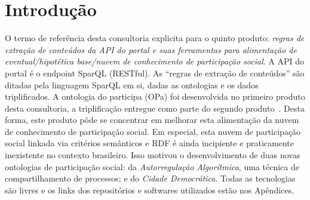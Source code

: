 \documentclass[12pt]{article}
\newcommand{\PalavrasChave}{reconhecimento de padrões, redes complexas, processamento de linguagem natural, web semântica, participação social}
\begin{document}



\tableofcontents
\newpage


\begin{abstract}
Este documento descreve a alimentação com dados do Participa.br da nuvem de conhecimento de participação social. Não havia dados participativos brasileiros linkados, então a nuvem foi iniciada com a especificação ontológica e triplificação dos dados de duas outras instâncias: do AA, um sistema de compartilhamento de processos usado por programadores e midialivristas; e do Cidade Democrática, um portal participativo capitaneado pela sociedade civil. A triplificação do participa.br e sua ontológia (OPa) foram feitas no primeiro e segundo produtos desta consultoria. Este trabalho aponta melhoras nesta integração do Participa.br aos dados linkados.
{\bf Palavras-chave:} \PalavrasChave.
\end{abstract}
\newpage

\section{Introdução}

O termo de referência desta consultoria explicita para o quinto produto: \emph{regras de extração de conteúdos da API do portal e suas ferramentas para alimentação de eventual/hipotética base/nuvem de conhecimento de participação social}. A API do portal é o endpoint SparQL (RESTful). As ``regras de extração de conteúdos'' são ditadas pela linguagem SparQL em si, dadas as ontologias e os dados triplificados. A ontologia do participa (OPa) foi desenvolvida no primeiro produto desta consultoria, a triplificação entregue como parte do segundo produto~\cite{repoProd1, repoProd2}. Desta forma, este produto pôde se concentrar em melhorar esta alimentação da nuvem de conhecimento de participação social. Em especial, esta nuvem de participação social linkada via critérios semânticos e RDF é ainda incipiente e praticamente inexistente no contexto brasileiro. Isso motivou o desenvolvimento de duas novas ontologias de participação social: da \emph{Autorregulação Algorítmica}, uma técnica de compartilhamento de processos; e do \emph{Cidade Democrática}. Todas as tecnologias são livres e os links dos repositórios e softwares utilizados estão nos Apêndices.
\end{document}
